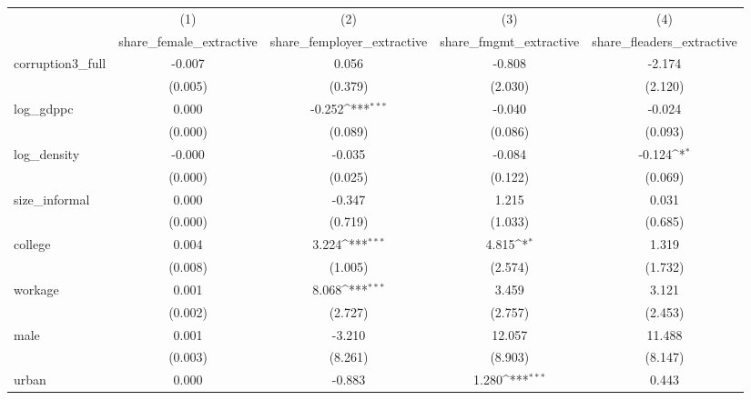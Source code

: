 {
\def\sym#1{\ifmmode^{#1}\else\(^{#1}\)\fi}
\begin{tabular}{l*{4}{c}}
\hline\hline
            &\multicolumn{1}{c}{(1)}&\multicolumn{1}{c}{(2)}&\multicolumn{1}{c}{(3)}&\multicolumn{1}{c}{(4)}\\
            &\multicolumn{1}{c}{share\_female\_extractive}&\multicolumn{1}{c}{share\_femployer\_extractive}&\multicolumn{1}{c}{share\_fmgmt\_extractive}&\multicolumn{1}{c}{share\_fleaders\_extractive}\\
\hline
corruption3\_full&      -0.007         &       0.056         &      -0.808         &      -2.174         \\
            &     (0.005)         &     (0.379)         &     (2.030)         &     (2.120)         \\
[1em]
log\_gdppc   &       0.000         &      -0.252\sym{***}&      -0.040         &      -0.024         \\
            &     (0.000)         &     (0.089)         &     (0.086)         &     (0.093)         \\
[1em]
log\_density &      -0.000         &      -0.035         &      -0.084         &      -0.124\sym{*}  \\
            &     (0.000)         &     (0.025)         &     (0.122)         &     (0.069)         \\
[1em]
size\_informal&       0.000         &      -0.347         &       1.215         &       0.031         \\
            &     (0.000)         &     (0.719)         &     (1.033)         &     (0.685)         \\
[1em]
college     &       0.004         &       3.224\sym{***}&       4.815\sym{*}  &       1.319         \\
            &     (0.008)         &     (1.005)         &     (2.574)         &     (1.732)         \\
[1em]
workage     &       0.001         &       8.068\sym{***}&       3.459         &       3.121         \\
            &     (0.002)         &     (2.727)         &     (2.757)         &     (2.453)         \\
[1em]
male        &       0.001         &      -3.210         &      12.057         &      11.488         \\
            &     (0.003)         &     (8.261)         &     (8.903)         &     (8.147)         \\
[1em]
urban       &       0.000         &      -0.883         &       1.280\sym{***}&       0.443         \\

\end{tabular}}
